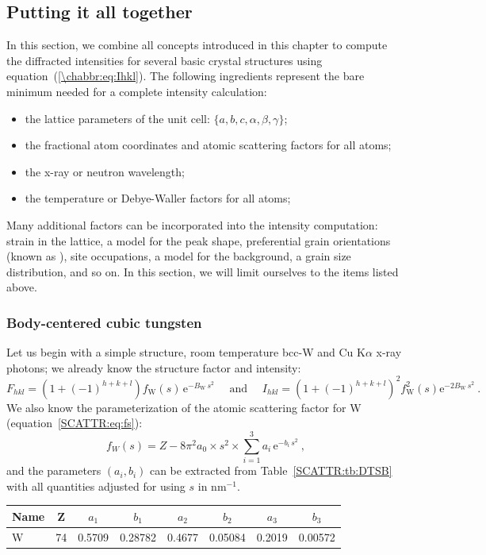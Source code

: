 \subsection{Putting it all together}\label{\chabbr:ssec:totalintensity}
In this section, we combine all concepts introduced in this chapter to compute the diffracted intensities for several basic crystal structures using equation~(\ref{\chabbr:eq:Ihkl}).  The following ingredients represent the bare minimum needed for a complete intensity calculation:
\begin{itemize}
	\item the lattice parameters of the unit cell: $\{a,b,c,\alpha,\beta,\gamma\}$;
	\item the fractional atom coordinates and atomic scattering factors for all atoms;
	\item the x-ray or neutron wavelength;
	\item the temperature or Debye-Waller factors for all atoms;
\end{itemize}
Many additional factors can be incorporated into the intensity computation: strain in the lattice, a model for the peak shape, preferential grain orientations (known as ), site occupations, a model for the background, a grain size distribution, and so on.  In this section, we will limit ourselves to the items listed above.

\subsubsection{Body-centered cubic tungsten}
Let us begin with a simple structure, room temperature bcc-W and Cu K$\alpha$ x-ray photons; we already know the structure factor and intensity:
\[
	F_{hkl} = \left(1+(-1)^{h+k+l}\right) f_\text{W}(s)\,\mathrm{e}^{-B_\text{W}\,s^2}\quad\text{ and }\quad I_{hkl} = \left(1+(-1)^{h+k+l}\right)^2 f^2_\text{W}(s)\mathrm{e}^{-2B_\text{W}\,s^2}\ .
\]
We also know the parameterization of the atomic scattering factor for W (equation~\ref{SCATTR:eq:fs}):
\[
	f_W(s) = Z - 8\pi^2a_0\times s^2\times \sum_{i=1}^3 a_i\,\mathrm{e}^{-b_i\, s^2}\ ,
\]
and the parameters $(a_i,b_i)$ can be extracted from Table~\ref{SCATTR:tb:DTSB} with all quantities adjusted for using $s$ in nm$^{-1}$.

\begin{center}
\begin{tabular}{|l|c|cccccc|}
\hline
Name&Z &$a_1$&$b_1$&$a_2$&$b_2$&$a_3$&$b_3$\\
\hline\hline
W & 74&0.5709& 0.28782 &0.4677 & 0.05084 &0.2019 &0.00572\\
\hline
\end{tabular}
\end{center}

